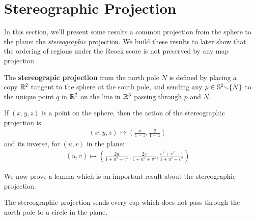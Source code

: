 \section{Stereographic Projection}
In this section, we'll present some results a common
projection from the sphere to the plane: the \textit{stereographic} projection.  
We build these results to 
later show that the  ordering of regions under   the Reock score is not preserved
by any map projection.


\begin{definition}
	The \textbf{stereograpic projection} from the north pole $N$ is
	defined by placing a copy $\mathbb{R}^2$ tangent to the sphere at the south
	pole, and sending any $p\in \mathbb{S}^2{\smallsetminus} \{N\}$ to 
	the unique point $q$ in $\mathbb{R}^2$ on the line in $\mathbb{R}^3$ passing 
	through $p$ and $N$.
	
	If $(x,y,z)$ is a point on the sphere, then the action of the
	stereographic projection is
	\begin{align*}
	(x,y,z)\mapsto \left(\frac{x}{1-z},\frac{y}{1-z}\right)
	\end{align*}
	and its inverse, for $(u,v)$ in the plane:
	\begin{align*}
	(u,v)\mapsto \left( \frac{2u}{1+u^2+v^2},\frac{2v}{1+u^2+v^2},
	\frac{u^2+v^2-1}{1+u^2+v^2}   \right)
	\end{align*}
	
\end{definition}

We now prove a lemma which is an important result about the stereographic projection.


\begin{lemma}
	\label{lem:stereocirc}
  The stereographic projection sends every cap which does not pass
  through the north pole to a circle in the plane.
\end{lemma}


